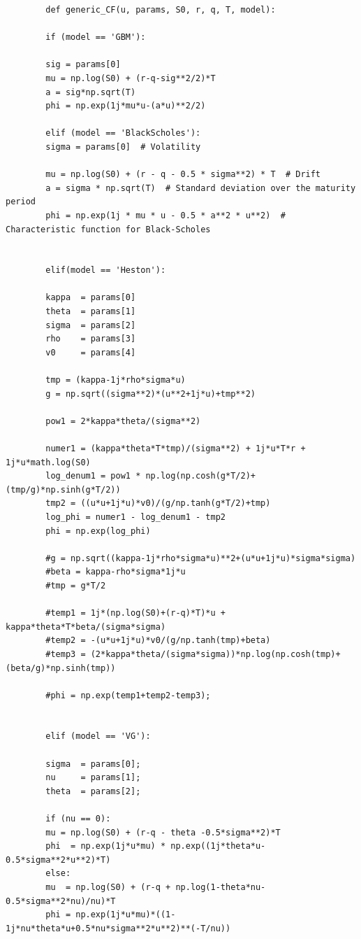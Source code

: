 \documentclass[letterpaper]{article}
\begin{document}
\begin{lstlisting}
       	def generic_CF(u, params, S0, r, q, T, model):
       	
       	if (model == 'GBM'):
       	
       	sig = params[0]
       	mu = np.log(S0) + (r-q-sig**2/2)*T
       	a = sig*np.sqrt(T)
       	phi = np.exp(1j*mu*u-(a*u)**2/2)
       	
       	elif (model == 'BlackScholes'):
       	sigma = params[0]  # Volatility
       	
       	mu = np.log(S0) + (r - q - 0.5 * sigma**2) * T  # Drift
       	a = sigma * np.sqrt(T)  # Standard deviation over the maturity period
       	phi = np.exp(1j * mu * u - 0.5 * a**2 * u**2)  # Characteristic function for Black-Scholes
       	
       	
       	elif(model == 'Heston'):
       	
       	kappa  = params[0]
       	theta  = params[1]
       	sigma  = params[2]
       	rho    = params[3]
       	v0     = params[4]
       	
       	tmp = (kappa-1j*rho*sigma*u)
       	g = np.sqrt((sigma**2)*(u**2+1j*u)+tmp**2)
       	
       	pow1 = 2*kappa*theta/(sigma**2)
       	
       	numer1 = (kappa*theta*T*tmp)/(sigma**2) + 1j*u*T*r + 1j*u*math.log(S0)
       	log_denum1 = pow1 * np.log(np.cosh(g*T/2)+(tmp/g)*np.sinh(g*T/2))
       	tmp2 = ((u*u+1j*u)*v0)/(g/np.tanh(g*T/2)+tmp)
       	log_phi = numer1 - log_denum1 - tmp2
       	phi = np.exp(log_phi)
       	
       	#g = np.sqrt((kappa-1j*rho*sigma*u)**2+(u*u+1j*u)*sigma*sigma)
       	#beta = kappa-rho*sigma*1j*u
       	#tmp = g*T/2
       	
       	#temp1 = 1j*(np.log(S0)+(r-q)*T)*u + kappa*theta*T*beta/(sigma*sigma)
       	#temp2 = -(u*u+1j*u)*v0/(g/np.tanh(tmp)+beta)
       	#temp3 = (2*kappa*theta/(sigma*sigma))*np.log(np.cosh(tmp)+(beta/g)*np.sinh(tmp))
       	
       	#phi = np.exp(temp1+temp2-temp3);
       	
       	
       	elif (model == 'VG'):
       	
       	sigma  = params[0];
       	nu     = params[1];
       	theta  = params[2];
       	
       	if (nu == 0):
       	mu = np.log(S0) + (r-q - theta -0.5*sigma**2)*T
       	phi  = np.exp(1j*u*mu) * np.exp((1j*theta*u-0.5*sigma**2*u**2)*T)
       	else:
       	mu  = np.log(S0) + (r-q + np.log(1-theta*nu-0.5*sigma**2*nu)/nu)*T
       	phi = np.exp(1j*u*mu)*((1-1j*nu*theta*u+0.5*nu*sigma**2*u**2)**(-T/nu))
       	

\end{lstlisting}
\end{document}
